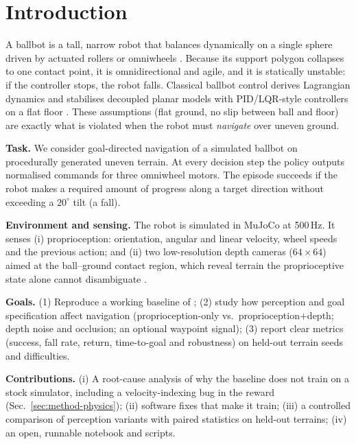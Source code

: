 \documentclass[conference]{IEEEtran}
\begin{document}
\section{Introduction}
A ballbot is a tall, narrow robot that balances dynamically on a single sphere driven by actuated rollers or omniwheels \cite{lauwers2006,nagarajan2014}. Because its support polygon collapses to one contact point, it is omnidirectional and agile, and it is statically unstable: if the controller stops, the robot falls. Classical ballbot control derives Lagrangian dynamics and stabilises decoupled planar models with PID/LQR-style controllers on a flat floor \cite{nagarajan2014,abdelrahim2025}. These assumptions (flat ground, no slip between ball and floor) are exactly what is violated when the robot must \emph{navigate} over uneven ground.

\textbf{Task.} We consider goal-directed navigation of a simulated ballbot on procedurally generated uneven terrain. At every decision step the policy outputs normalised commands for three omniwheel motors. The episode succeeds if the robot makes a required amount of progress along a target direction without exceeding a $20^\circ$ tilt (a fall).

\textbf{Environment and sensing.} The robot is simulated in MuJoCo \cite{todorov2012} at 500\,Hz. It senses (i) proprioception: orientation, angular and linear velocity, wheel speeds and the previous action; and (ii) two low-resolution depth cameras ($64{\times}64$) aimed at the ball--ground contact region, which reveal terrain the proprioceptive state alone cannot disambiguate \cite{salehi2025}.

\textbf{Goals.} (1) Reproduce a working baseline of \cite{salehi2025,salehi2025code}; (2) study how perception and goal specification affect navigation (proprioception-only vs.\ proprioception$+$depth; depth noise and occlusion; an optional waypoint signal); (3) report clear metrics (success, fall rate, return, time-to-goal and robustness) on held-out terrain seeds and difficulties.

\textbf{Contributions.} (i) A root-cause analysis of why the baseline does not train on a stock simulator, including a velocity-indexing bug in the reward (Sec.~\ref{sec:method-physics}); (ii) software fixes that make it train; (iii) a controlled comparison of perception variants with paired statistics on held-out terrains; (iv) an open, runnable notebook and scripts.
\end{document}
